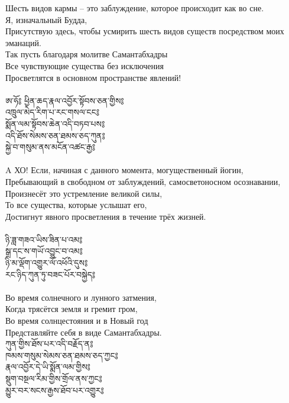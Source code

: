 Шесть видов кармы – это заблуждение, которое происходит как во сне. \\
Я, изначальный Будда, \\
Присутствую здесь, чтобы усмирить шесть видов существ посредством моих эманаций. \\
Так пусть благодаря молитве Самантабхадры \\
Все чувствующие существа без исключения \\
Просветлятся в основном пространстве явлений!\\
\\
\newpage
{\ti
ཨ་ཧོ༔ ཕྱིན་ཆད་རྣལ་འབྱོར་སྟོབས་ཅན་གྱིས༔ \\
འཁྲུལ་མེད་རིག་པ་རང་གསལ་ངང༔ \\
སྨོན་ལམ་སྟོབས་ཆེན་འདི་བཏབ་པས༔ \\
འདི་ཐོས་སེམས་ཅན་ཐམས་ཅད་ཀུན༔ \\
སྐྱེ་བ་གསུམ་ནས་མངོན་འཚང་རྒྱ༔}\\
\\
A ХО! Если, начиная с данного момента, могущественный йогин, \\
Пребывающий в свободном от заблуждений, самосветоносном осознавании, \\
Произнесёт это устремление великой силы, \\
То все существа, которые услышат его, \\
Достигнут явного просветления в течение трёх жизней.\\
\\
{\ti
ཉི་ཟླ་གཟའ་ཡིས་ཟིན་པ་འམ༔ \\
སྒྲ་དང་ས་གཡོ་འབྱུང་བ་འམ༔ \\
ཉི་མ་ལྡོག་འགྱུར་ལོ་འཕོའི་དུས༔ \\
རང་ཉིད་ཀུན་ཏུ་བཟང་པོར་བསྐྱེད༔}\\
\\
Во время солнечного и лунного затмения, \\
Когда трясётся земля и гремит гром, \\
Во время солнцестояния и в Новый год \\
Представляйте себя в виде Самантабхадры.\\
\newpage
{\ti
ཀུན་གྱིས་ཐོས་པར་འདི་བརྗོད་ན༔ \\
ཁམས་གསུམ་སེམས་ཅན་ཐམས་ཅད་ཀྱང༔ \\
རྣལ་འབྱོར་དེ་ཡི་སྨོན་ལམ་གྱིས༔ \\
སྡུག་བསྔལ་རིམ་གྱིས་གྲོལ་ནས་ཀྱང༔ \\
མྱུར་བར་སངས་རྒྱས་ཐོབ་པར་འགྱུར༔}\\
\\
